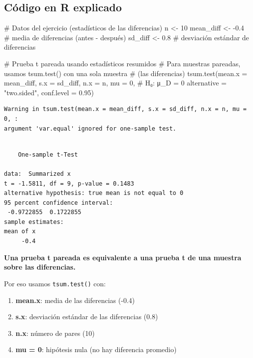 \documentclass[
  spanish,
  letterpaper,
]{book}
\newenvironment{Shaded}{\begin{snugshade}}{\end{snugshade}}
\newcommand{\AttributeTok}[1]{\textcolor[rgb]{0.40,0.45,0.13}{#1}}
\newcommand{\CommentTok}[1]{\textcolor[rgb]{0.37,0.37,0.37}{#1}}
\newcommand{\DecValTok}[1]{\textcolor[rgb]{0.68,0.00,0.00}{#1}}
\newcommand{\FloatTok}[1]{\textcolor[rgb]{0.68,0.00,0.00}{#1}}
\newcommand{\FunctionTok}[1]{\textcolor[rgb]{0.28,0.35,0.67}{#1}}
\newcommand{\NormalTok}[1]{\textcolor[rgb]{0.00,0.23,0.31}{#1}}
\newcommand{\OtherTok}[1]{\textcolor[rgb]{0.00,0.23,0.31}{#1}}
\newcommand{\SpecialCharTok}[1]{\textcolor[rgb]{0.37,0.37,0.37}{#1}}
\newcommand{\StringTok}[1]{\textcolor[rgb]{0.13,0.47,0.30}{#1}}
\begin{document}
\subsection{Código en R explicado}\label{cuxf3digo-en-r-explicado-2}

\begin{Shaded}
\begin{Highlighting}[]
\CommentTok{\# Datos del ejercicio (estadísticos de las diferencias)}
\NormalTok{n }\OtherTok{\textless{}{-}} \DecValTok{10}
\NormalTok{mean\_diff }\OtherTok{\textless{}{-}} \SpecialCharTok{{-}}\FloatTok{0.4}    \CommentTok{\# media de diferencias (antes {-} después)}
\NormalTok{sd\_diff }\OtherTok{\textless{}{-}} \FloatTok{0.8}       \CommentTok{\# desviación estándar de diferencias}

\CommentTok{\# Prueba t pareada usando estadísticos resumidos}
\CommentTok{\# Para muestras pareadas, usamos tsum.test() con una sola muestra}
\CommentTok{\# (las diferencias)}
\FunctionTok{tsum.test}\NormalTok{(}\AttributeTok{mean.x =}\NormalTok{ mean\_diff,}
          \AttributeTok{s.x =}\NormalTok{ sd\_diff,}
          \AttributeTok{n.x =}\NormalTok{ n,}
          \AttributeTok{mu =} \DecValTok{0}\NormalTok{,                    }\CommentTok{\# H₀: μ\_D = 0}
          \AttributeTok{alternative =} \StringTok{"two.sided"}\NormalTok{,}
          \AttributeTok{conf.level =} \FloatTok{0.95}\NormalTok{)}
\end{Highlighting}
\end{Shaded}

\begin{verbatim}
Warning in tsum.test(mean.x = mean_diff, s.x = sd_diff, n.x = n, mu = 0, :
argument 'var.equal' ignored for one-sample test.
\end{verbatim}

\begin{verbatim}

    One-sample t-Test

data:  Summarized x
t = -1.5811, df = 9, p-value = 0.1483
alternative hypothesis: true mean is not equal to 0
95 percent confidence interval:
 -0.9722855  0.1722855
sample estimates:
mean of x 
     -0.4 
\end{verbatim}

\textbf{Una prueba t pareada es equivalente a una prueba t de una
muestra sobre las diferencias.}

Por eso usamos \texttt{tsum.test()} con:

\begin{enumerate}
\def\labelenumi{\arabic{enumi}.}
\item
  \textbf{mean.x}: media de las diferencias (-0.4)
\item
  \textbf{s.x}: desviación estándar de las diferencias (0.8)
\item
  \textbf{n.x}: número de pares (10)
\item
  \textbf{mu = 0}: hipótesis nula (no hay diferencia promedio)
\end{enumerate}
\end{document}
